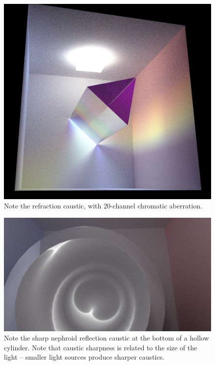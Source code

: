 \documentclass[10pt]{article}
\begin{document}
\begin{figure} 
\centering
  \includegraphics[width = 6 in]{v_rt_reflect_prism3.png}
  \caption{ Note the refraction caustic, with 20-channel chromatic aberration.
}
\end{figure}


\begin{figure} 
\centering
  \includegraphics[width = 6 in]{sharp_caustic.png}
  \caption{ Note the sharp nephroid reflection caustic at the bottom of a hollow cylinder.
Note that caustic sharpness is related to the size of the light -- smaller light sources produce sharper caustics.
}
\end{figure}
\end{document}
